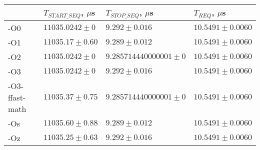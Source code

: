 \begin{tabular}{llll}
\toprule
 & $T_{START\_SEQ}$, $\mu$s & $T_{STOP\_SEQ}$, $\mu$s & $T_{REQ}$, $\mu$s \\
\midrule
-O0 & $11035.0242 \pm 0$ & $9.292 \pm 0.016$ & $10.5491 \pm 0.0060$ \\
-O1 & $11035.17 \pm 0.60$ & $9.289 \pm 0.012$ & $10.5491 \pm 0.0060$ \\
-O2 & $11035.0242 \pm 0$ & $9.285714440000001 \pm 0$ & $10.5491 \pm 0.0060$ \\
-O3 & $11035.0242 \pm 0$ & $9.292 \pm 0.016$ & $10.5491 \pm 0.0060$ \\
-O3-ffast-math & $11035.37 \pm 0.75$ & $9.285714440000001 \pm 0$ & $10.5491 \pm 0.0060$ \\
-Os & $11035.60 \pm 0.88$ & $9.289 \pm 0.012$ & $10.5491 \pm 0.0060$ \\
-Oz & $11035.25 \pm 0.63$ & $9.292 \pm 0.016$ & $10.5491 \pm 0.0060$ \\
\bottomrule
\end{tabular}
